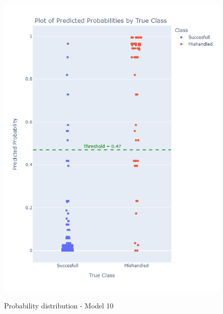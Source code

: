 \documentclass[12pt]{article}
\begin{document}
\begin{figure}
\begin{minipage}[c]{0.4\linewidth}
    \includegraphics[width=1\textwidth]{Probability_distribution_Model 10.png}\\
    \caption{Probability distribution - Model 10}
\end{minipage}%
\end{figure}
\end{document}
